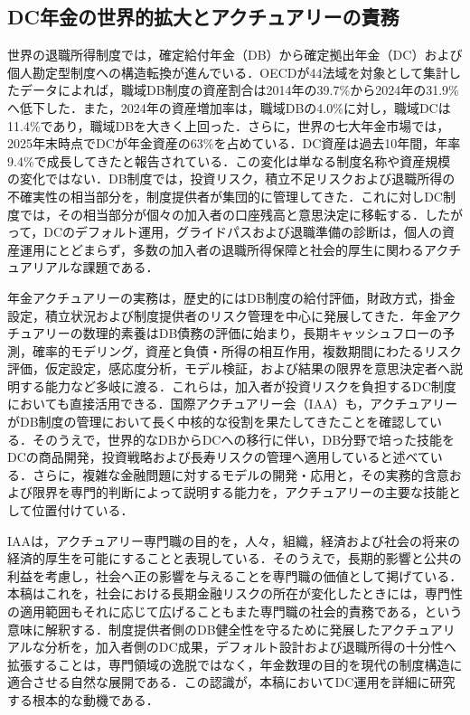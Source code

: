 \documentclass[10pt,a4paper]{article}
\theoremstyle{plain}
\theoremstyle{definition}
\begin{document}
\subsection{DC年金の世界的拡大とアクチュアリーの責務}

世界の退職所得制度では，確定給付年金（DB）から確定拠出年金（DC）および個人勘定型制度への構造転換が進んでいる．OECDが44法域を対象として集計したデータによれば，職域DB制度の資産割合は2014年の39.7\%から2024年の31.9\%へ低下した．また，2024年の資産増加率は，職域DBの4.0\%に対し，職域DCは11.4\%であり，職域DBを大きく上回った\citep{OECD2025PensionMarkets}．さらに，世界の七大年金市場では，2025年末時点でDCが年金資産の63\%を占めている．DC資産は過去10年間，年率9.4\%で成長してきたと報告されている\citep{TAI2026GPAS}．この変化は単なる制度名称や資産規模の変化ではない．DB制度では，投資リスク，積立不足リスクおよび退職所得の不確実性の相当部分を，制度提供者が集団的に管理してきた．これに対しDC制度では，その相当部分が個々の加入者の口座残高と意思決定に移転する．したがって，DCのデフォルト運用，グライドパスおよび退職準備の診断は，個人の資産運用にとどまらず，多数の加入者の退職所得保障と社会的厚生に関わるアクチュアリアルな課題である．

年金アクチュアリーの実務は，歴史的にはDB制度の給付評価，財政方式，掛金設定，積立状況および制度提供者のリスク管理を中心に発展してきた．年金アクチュアリーの数理的素養はDB債務の評価に始まり，長期キャッシュフローの予測，確率的モデリング，資産と負債・所得の相互作用，複数期間にわたるリスク評価，仮定設定，感応度分析，モデル検証，および結果の限界を意思決定者へ説明する能力など多岐に渡る．これらは，加入者が投資リスクを負担するDC制度においても直接活用できる．国際アクチュアリー会（IAA）も，アクチュアリーがDB制度の管理において長く中核的な役割を果たしてきたことを確認している．そのうえで，世界的なDBからDCへの移行に伴い，DB分野で培った技能をDCの商品開発，投資戦略および長寿リスクの管理へ適用していると述べている\citep{IAA2021DCRoadmap}．さらに，複雑な金融問題に対するモデルの開発・応用と，その実務的含意および限界を専門的判断によって説明する能力を，アクチュアリーの主要な技能として位置付けている\citep{IAA2013Role}．

IAAは，アクチュアリー専門職の目的を，人々，組織，経済および社会の将来の経済的厚生を可能にすることと表現している．そのうえで，長期的影響と公共の利益を考慮し，社会へ正の影響を与えることを専門職の価値として掲げている\citep{IAA2016Profession}．本稿はこれを，社会における長期金融リスクの所在が変化したときには，専門性の適用範囲もそれに応じて広げることもまた専門職の社会的責務である，という意味に解釈する．制度提供者側のDB健全性を守るために発展したアクチュアリアルな分析を，加入者側のDC成果，デフォルト設計および退職所得の十分性へ拡張することは，専門領域の逸脱ではなく，年金数理の目的を現代の制度構造に適合させる自然な展開である．この認識が，本稿においてDC運用を詳細に研究する根本的な動機である．
\end{document}
